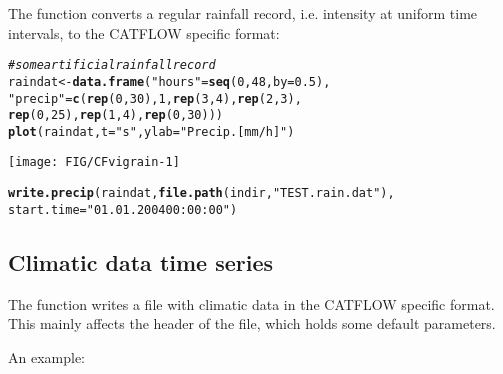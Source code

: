 \documentclass[article,nojss]{jss}\usepackage[]{graphicx}\usepackage[]{xcolor}
\makeatletter
\def\maxwidth{ %
  \ifdim\Gin@nat@width>\linewidth
    \linewidth
  \else
    \Gin@nat@width
  \fi
}
\newcommand{\hlnum}[1]{\textcolor[rgb]{0.686,0.059,0.569}{#1}}%
\newcommand{\hlsng}[1]{\textcolor[rgb]{0.192,0.494,0.8}{#1}}%
\newcommand{\hlcom}[1]{\textcolor[rgb]{0.678,0.584,0.686}{\textit{#1}}}%
\newcommand{\hldef}[1]{\textcolor[rgb]{0.345,0.345,0.345}{#1}}%
\newcommand{\hlkwb}[1]{\textcolor[rgb]{0.69,0.353,0.396}{#1}}%
\newcommand{\hlkwc}[1]{\textcolor[rgb]{0.333,0.667,0.333}{#1}}%
\newcommand{\hlkwd}[1]{\textcolor[rgb]{0.737,0.353,0.396}{\textbf{#1}}}%
\newenvironment{kframe}{%
 \def\at@end@of@kframe{}%
 \ifinner\ifhmode%
  \def\at@end@of@kframe{\end{minipage}}%
  \begin{minipage}{\columnwidth}%
 \fi\fi%
 \def\FrameCommand##1{\hskip\@totalleftmargin \hskip-\fboxsep
 \colorbox{shadecolor}{##1}\hskip-\fboxsep
     \hskip-\linewidth \hskip-\@totalleftmargin \hskip\columnwidth}%
 \MakeFramed {\advance\hsize-\width
   \@totalleftmargin\z@ \linewidth\hsize
   \@setminipage}}%
 {\par\unskip\endMakeFramed%
 \at@end@of@kframe}
\newenvironment{knitrout}{}{} %
\makeatother
\begin{document}
The function  converts a regular rainfall record, i.e. intensity at uniform time intervals, to the CATFLOW specific format:

\begin{knitrout}
\color{fgcolor}\begin{kframe}
\begin{alltt}
\hlcom{# some artificial rainfall record}
  \hldef{raindat} \hlkwb{<-} \hlkwd{data.frame}\hldef{(}\hlsng{"hours"} \hldef{=} \hlkwd{seq}\hldef{(}\hlnum{0}\hldef{,}\hlnum{48}\hldef{,} \hlkwc{by}\hldef{=}\hlnum{0.5}\hldef{),}
                        \hlsng{"precip"} \hldef{=} \hlkwd{c}\hldef{(}\hlkwd{rep}\hldef{(}\hlnum{0}\hldef{,}\hlnum{30}\hldef{),} \hlnum{1}\hldef{,} \hlkwd{rep}\hldef{(}\hlnum{3}\hldef{,}\hlnum{4}\hldef{),} \hlkwd{rep}\hldef{(}\hlnum{2}\hldef{,}\hlnum{3}\hldef{),}
                                      \hlkwd{rep}\hldef{(}\hlnum{0}\hldef{,}\hlnum{25}\hldef{),} \hlkwd{rep}\hldef{(}\hlnum{1}\hldef{,}\hlnum{4}\hldef{),} \hlkwd{rep}\hldef{(}\hlnum{0}\hldef{,}\hlnum{30}\hldef{)) )}
  \hlkwd{plot}\hldef{(raindat,} \hlkwc{t}\hldef{=}\hlsng{"s"}\hldef{,} \hlkwc{ylab}\hldef{=}\hlsng{"Precip. [mm/h]"}\hldef{)}
\end{alltt}
\end{kframe}
\texttt{[image: FIG/CFvigrain-1]} 
\begin{kframe}\begin{alltt}
  \hlkwd{write.precip}\hldef{(raindat,} \hlkwd{file.path}\hldef{(indir,} \hlsng{"TEST.rain.dat"}\hldef{),}
                \hlkwc{start.time}\hldef{=} \hlsng{"01.01.2004 00:00:00"} \hldef{)}
\end{alltt}
\end{kframe}
\end{knitrout}



\subsection{Climatic data time series}\label{sec:clima} 

 The function  writes a file with climatic data in the CATFLOW specific
 format. This mainly affects the header of the file, which holds some default parameters. 
 
 An example: 
                                               
\end{document}
